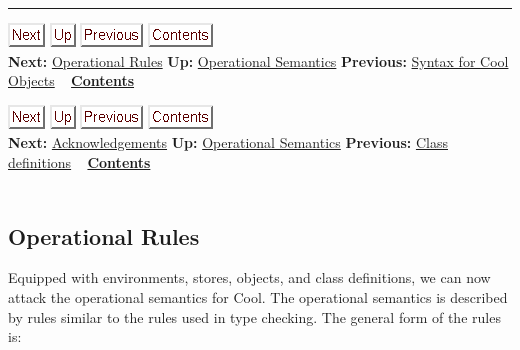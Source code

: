\documentclass[]{article}
\begin{document}
\begin{center}\rule{3in}{0.4pt}\end{center}

\href{node48.html}{\includegraphics{next.png}}
\href{node44.html}{\includegraphics{up.png}}
\href{node46.html}{\includegraphics{prev.png}}
\href{node1.html}{\includegraphics{contents.png}} \\ \textbf{Next:}
\href{node48.html}{Operational Rules} \textbf{Up:}
\href{node44.html}{Operational Semantics} \textbf{Previous:}
\href{node46.html}{Syntax for Cool Objects} ~
\textbf{\href{node1.html}{Contents}}

\href{node49.html}{\includegraphics{next.png}}
\href{node44.html}{\includegraphics{up.png}}
\href{node47.html}{\includegraphics{prev.png}}
\href{node1.html}{\includegraphics{contents.png}} \\ \textbf{Next:}
\href{node49.html}{Acknowledgements} \textbf{Up:}
\href{node44.html}{Operational Semantics} \textbf{Previous:}
\href{node47.html}{Class definitions} ~
\textbf{\href{node1.html}{Contents}} \\ \\

\subsection{Operational Rules}

Equipped with environments, stores, objects, and class definitions, we
can now attack the operational semantics for Cool. The operational
semantics is described by rules similar to the rules used in type
checking. The general form of the rules is: \\
\end{document}
